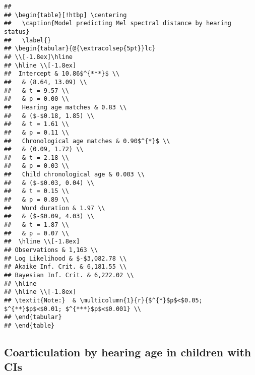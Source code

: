 \documentclass[
]{article}
\begin{document}
\begin{verbatim}
## 
## \begin{table}[!htbp] \centering 
##   \caption{Model predicting Mel spectral distance by hearing status} 
##   \label{} 
## \begin{tabular}{@{\extracolsep{5pt}}lc} 
## \\[-1.8ex]\hline 
## \hline \\[-1.8ex] 
##  Intercept & 10.86$^{***}$ \\ 
##   & (8.64, 13.09) \\ 
##   & t = 9.57 \\ 
##   & p = 0.00 \\ 
##   Hearing age matches & 0.83 \\ 
##   & ($-$0.18, 1.85) \\ 
##   & t = 1.61 \\ 
##   & p = 0.11 \\ 
##   Chronological age matches & 0.90$^{*}$ \\ 
##   & (0.09, 1.72) \\ 
##   & t = 2.18 \\ 
##   & p = 0.03 \\ 
##   Child chronological age & 0.003 \\ 
##   & ($-$0.03, 0.04) \\ 
##   & t = 0.15 \\ 
##   & p = 0.89 \\ 
##   Word duration & 1.97 \\ 
##   & ($-$0.09, 4.03) \\ 
##   & t = 1.87 \\ 
##   & p = 0.07 \\ 
##  \hline \\[-1.8ex] 
## Observations & 1,163 \\ 
## Log Likelihood & $-$3,082.78 \\ 
## Akaike Inf. Crit. & 6,181.55 \\ 
## Bayesian Inf. Crit. & 6,222.02 \\ 
## \hline 
## \hline \\[-1.8ex] 
## \textit{Note:}  & \multicolumn{1}{r}{$^{*}$p$<$0.05; $^{**}$p$<$0.01; $^{***}$p$<$0.001} \\ 
## \end{tabular} 
## \end{table}
\end{verbatim}

\hypertarget{coarticulation-by-hearing-age-in-children-with-cis}{%
\subsection{Coarticulation by hearing age in children with CIs}\label{coarticulation-by-hearing-age-in-children-with-cis}}
\end{document}
